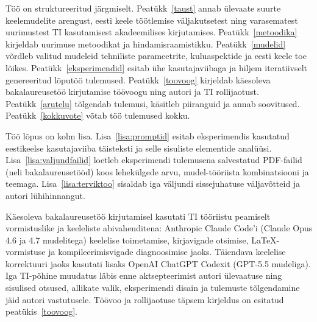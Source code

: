 Töö on struktureeritud järgmiselt. Peatükk~\ref{taust} annab ülevaate suurte keelemudelite arengust, eesti keele töötlemise väljakutsetest ning varasematest uurimustest TI kasutamisest akadeemilises kirjutamises. Peatükk~\ref{metoodika} kirjeldab uurimuse metoodikat ja hindamisraamistikku. Peatükk~\ref{mudelid} võrdleb valitud mudeleid tehniliste parameetrite, kuluaspektide ja eesti keele toe lõikes. Peatükk~\ref{eksperimendid} esitab ühe kasutajaviibaga ja hiljem iteratiivselt genereeritud lõputöö tulemused. Peatükk~\ref{toovoog} kirjeldab käesoleva bakalaureusetöö kirjutamise töövoogu ning autori ja TI rollijaotust. Peatükk~\ref{arutelu} tõlgendab tulemusi, käsitleb piiranguid ja annab soovitused. Peatükk~\ref{kokkuvote} võtab töö tulemused kokku.

Töö lõpus on kolm lisa. Lisa~\ref{lisa:promptid} esitab eksperimendis kasutatud eestikeelse kasutajaviiba täisteksti ja selle sisuliste elementide analüüsi. Lisa~\ref{lisa:valjundfailid} loetleb eksperimendi tulemusena salvestatud PDF-failid (neli bakalaureusetööd) koos lehekülgede arvu, mudel-tööriista kombinatsiooni ja teemaga. Lisa~\ref{lisa:terviktoo} sisaldab iga väljundi sissejuhatuse väljavõtteid ja autori lühihinnangut.

Käesoleva bakalaureusetöö kirjutamisel kasutati TI tööriistu peamiselt vormistuslike ja keeleliste abivahenditena: Anthropic Claude Code'i (Claude Opus 4.6 ja 4.7 mudelitega) keelelise toimetamise, kirjavigade otsimise, \LaTeX{}-vormistuse ja kompileerimisvigade diagnoosimise jaoks. Täiendava keelelise korrektuuri jaoks kasutati lisaks OpenAI ChatGPT Codexit (GPT-5.5 mudeliga). Iga TI-põhine muudatus läbis enne aktsepteerimist autori ülevaatuse ning sisulised otsused, allikate valik, eksperimendi disain ja tulemuste tõlgendamine jäid autori vastutusele. Töövoo ja rollijaotuse täpsem kirjeldus on esitatud peatükis~\ref{toovoog}.
